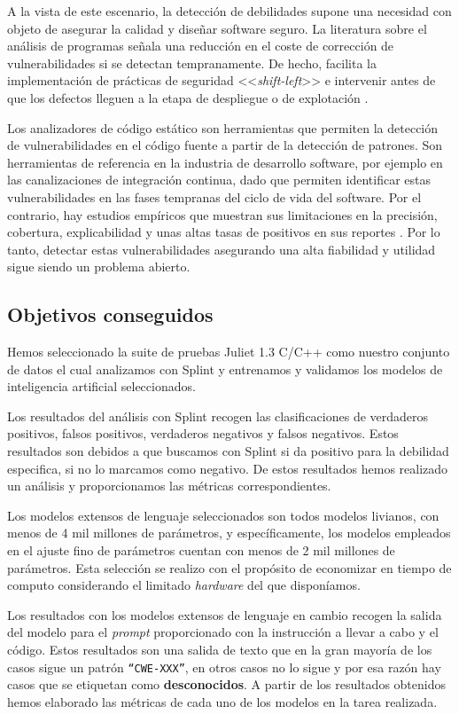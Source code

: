 \documentclass[12pt, a4paper, twoside]{article}
\begin{document}
A la vista de este escenario, la detección de debilidades supone una necesidad con objeto de asegurar la calidad y diseñar software seguro. La literatura sobre el análisis de programas señala una reducción en el coste de corrección de vulnerabilidades si se detectan tempranamente. De hecho, facilita la implementación de prácticas de seguridad <<\textit{shift-left}>> e intervenir antes de que los defectos lleguen a la etapa de despliegue o de explotación \cite{cifuentes-2023}.

Los analizadores de código estático son herramientas que permiten la detección de vulnerabilidades en el código fuente a partir de la detección de patrones. Son herramientas de referencia en la industria de desarrollo software, por ejemplo en las canalizaciones de integración continua, dado que permiten identificar estas vulnerabilidades en las fases tempranas del ciclo de vida del software. Por el contrario, hay estudios empíricos que muestran sus limitaciones en la precisión, cobertura, explicabilidad y unas altas tasas de positivos en sus reportes \cite{aloraini-2019}. Por lo tanto, detectar estas vulnerabilidades asegurando una alta fiabilidad y utilidad sigue siendo un problema abierto.

\subsection{Objetivos conseguidos}
Hemos seleccionado la suite de pruebas Juliet 1.3 C/C++ como nuestro conjunto de datos el cual analizamos con Splint y entrenamos y validamos los modelos de inteligencia artificial seleccionados.

Los resultados del análisis con Splint recogen las clasificaciones de verdaderos positivos, falsos positivos, verdaderos negativos y falsos negativos. Estos resultados son debidos a que buscamos con Splint si da positivo para la debilidad especifica, si no lo marcamos como negativo. De estos resultados hemos realizado un análisis y proporcionamos las métricas correspondientes.

Los modelos extensos de lenguaje seleccionados son todos modelos livianos, con menos de 4 mil millones de parámetros, y específicamente, los modelos empleados en el ajuste fino de parámetros cuentan con menos de 2 mil millones de parámetros. Esta selección se realizo con el propósito de economizar en tiempo de computo considerando el limitado \textit{hardware} del que disponíamos.

Los resultados con los modelos extensos de lenguaje en cambio recogen la salida del modelo para el \textit{prompt} proporcionado con la instrucción a llevar a cabo y el código. Estos resultados son una salida de texto que en la gran mayoría de los casos sigue un patrón \texttt{\enquote{CWE-XXX}}, en otros casos no lo sigue y por esa razón hay casos que se etiquetan como \textbf{desconocidos}. A partir de los resultados obtenidos hemos elaborado las métricas de cada uno de los modelos en la tarea realizada.
\end{document}
